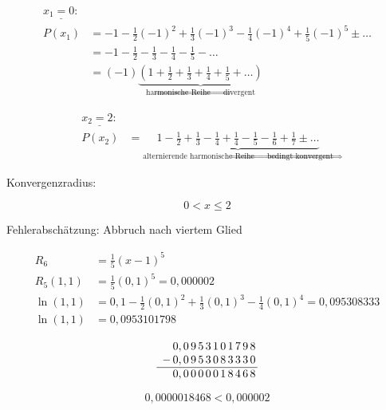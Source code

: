 \begin{align*}
    \underline{x_1 = 0:} \\
    P(x_1) &= -1 - \frac{1}{2} (-1)^2 + \frac{1}{3} (-1)^3 - \frac{1}{4} (-1)^4 + \frac{1}{5} (-1)^5 \pm \ldots \\
    &= -1 - \frac{1}{2} - \frac{1}{3} - \frac{1}{4} - \frac{1}{5} - \ldots \\
    &= (-1) \underbrace{\left( 1 + \frac{1}{2} + \frac{1}{3} + \frac{1}{4} + \frac{1}{5} + \ldots \right)}_{\text{harmonische Reihe \(\Rightarrow\) divergent}}
\end{align*}

\begin{align*}
    \underline{x_2 = 2:} \\
    P(x_2) &= \underbrace{1 - \frac{1}{2} + \frac{1}{3} - \frac{1}{4} + \frac{1}{4} - \frac{1}{5} - \frac{1}{6} + \frac{1}{7} \pm \ldots}_{\text{alternierende harmonische Reihe \(\Rightarrow\) bedingt konvergent}}
\end{align*}

Konvergenzradius:

\[
    0 < x \leq 2
\]

Fehlerabschätzung: Abbruch nach viertem Glied

\begin{align*}
    R_6 &= \frac{1}{5} (x - 1)^5 \\
    R_5(1,1) &= \frac{1}{5} (0,1)^5 = 0,000002 \\
    \ln (1,1) &= 0,1 - \frac{1}{2} (0,1)^2 + \frac{1}{3} (0,1)^3 - \frac{1}{4} (0,1)^4 = 0,095308333 \\
    \ln (1,1) &= 0,0953101798
\end{align*}

\[
    \begin{array}{*{12}{c@{\,}}}
        & 0, & 0 & 9 & 5 & 3 & 1 & 0 & 1 & 7 & 9 & 8 \\
        - & 0, & 0 & 9 & 5 & 3 & 0 & 8 & 3 & 3 & 3 & 0 \\
        \hline
        & 0, & 0 & 0 & 0 & 0 & 0 & 1 & 8 & 4 & 6 & 8
    \end{array}
\]
    
\[
    0,0000018468 < 0,000002  
\]
